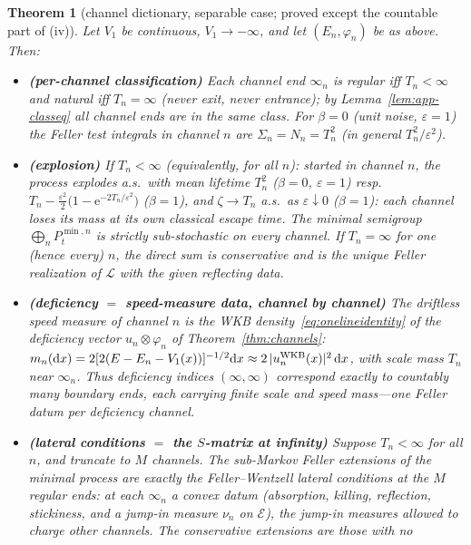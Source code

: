 \documentclass[11pt]{article}
\newtheorem{theorem}{Theorem}[section]
\theoremstyle{definition}
\theoremstyle{remark}
\newcommand{\dd}{\mathrm{d}}
\newcommand{\ee}{\mathrm{e}}
\begin{document}
\begin{theorem}[channel dictionary, separable case; proved except the
countable part of (iv)]\label{thm:app-separable}
Let $V_{1}$ be continuous, $V_{1}\to-\infty$, and let
$(E_{n},\varphi_{n})$ be as above. Then:
\begin{itemize}
\item[(i)] \textbf{(per-channel classification)} Each channel end
$\infty_{n}$ is \emph{regular} iff $T_{n}<\infty$ and \emph{natural}
iff $T_{n}=\infty$ (never exit, never entrance); by
Lemma~\ref{lem:app-classeq} all channel ends are in the same class. For
$\beta=0$ (unit noise, $\varepsilon=1$) the Feller test integrals in channel $n$ are
$\Sigma_{n}=N_{n}=T_{n}^{2}$ (in general $T_{n}^{2}/\varepsilon^{2}$).
\item[(ii)] \textbf{(explosion)} If $T_{n}<\infty$ (equivalently, for
all $n$): started in channel $n$, the process explodes a.s.\ with mean
lifetime $T_{n}^{2}$ ($\beta=0$, $\varepsilon=1$) resp.\
$T_{n}-\tfrac{\varepsilon^{2}}{2}
\bigl(1-\ee^{-2T_{n}/\varepsilon^{2}}\bigr)$ ($\beta=1$), and
$\zeta\to T_{n}$ a.s.\ as $\varepsilon\downarrow0$ ($\beta=1$): \emph{each channel
loses its mass at its own classical escape time}. The minimal
semigroup $\bigoplus_{n}P^{\min,n}_{t}$ is strictly sub-stochastic on
every channel. If $T_{n}=\infty$ for one (hence every) $n$, the direct
sum is conservative and is the unique Feller realization of
$\mathcal L$ with the given reflecting data.
\item[(iii)] \textbf{(deficiency $=$ speed-measure data, channel by
channel)} The driftless speed measure of channel $n$ is the WKB
density~\eqref{eq:onelineidentity} of the deficiency vector
$u_{n}\otimes\varphi_{n}$ of Theorem~\ref{thm:channels}:
$m_{n}(\dd x)=2[2(E-E_{n}-V_{1}(x))]^{-1/2}\dd x\approx
2\,|u_{n}^{\rm WKB}(x)|^{2}\,\dd x$, with scale mass $T_{n}$ near
$\infty_{n}$. Thus deficiency indices $(\infty,\infty)$ correspond
exactly to \emph{countably many boundary ends, each carrying finite
scale and speed mass}---one Feller datum per deficiency channel.
\item[(iv)] \textbf{(lateral conditions $=$ the $S$-matrix at
infinity)} Suppose $T_{n}<\infty$ for all $n$, and truncate to $M$
channels. The sub-Markov Feller extensions of the minimal process are
exactly the Feller--Wentzell lateral conditions at the $M$ regular
ends: at each $\infty_{n}$ a convex datum (absorption, killing,
reflection, stickiness, and a jump-in measure $\nu_{n}$ on
$\mathcal E$), the jump-in measures allowed to charge \emph{other}
channels. The conservative extensions are those with no

\end{itemize}
\end{theorem}
\end{document}
